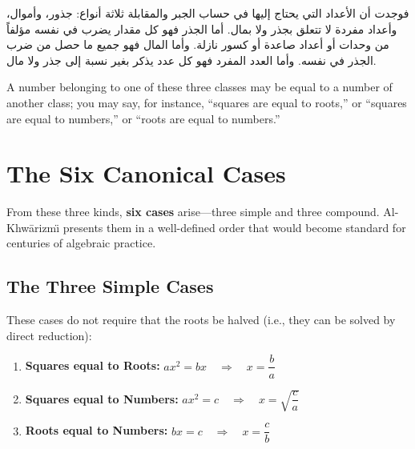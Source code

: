 \documentclass[11pt,a4paper,openany,oneside]{book}
\begin{document}
\begin{arabicbox}
\begin{Arabic}
فوجدت أن الأعداد التي يحتاج إليها في حساب الجبر والمقابلة
ثلاثة أنواع: جذور، وأموال، وأعداد مفردة لا تتعلق بجذر ولا
بمال. أما الجذر فهو كل مقدار يضرب في نفسه مؤلفاً من
وحدات أو أعداد صاعدة أو كسور نازلة. وأما المال فهو جميع ما
حصل من ضرب الجذر في نفسه. وأما العدد المفرد فهو كل عدد
يذكر بغير نسبة إلى جذر ولا مال.
\end{Arabic}
\end{arabicbox}

A number belonging to one of these three classes may be equal to a number of
another class; you may say, for instance, ``squares are equal to roots,'' or
``squares are equal to numbers,'' or ``roots are equal to numbers.''

\newpage

\section{The Six Canonical Cases}
\label{sec:six-cases}

From these three kinds, \textbf{six cases} arise---three simple and three
compound. Al-Khw\=arizm\"{\i} presents them in a well-defined order that would
become standard for centuries of algebraic practice.

\subsection{The Three Simple Cases}

These cases do not require that the roots be halved (i.e., they can be solved
by direct reduction):

\begin{mathbox}[title={\textbf{Simple Cases (do not require halving)}}]
\begin{enumerate}[label=\textbf{Case \Roman*:},leftmargin=3em]
  \item \textbf{Squares equal to Roots:}
  $ax^2 = bx \quad\Longrightarrow\quad x = \dfrac{b}{a}$
  
  \item \textbf{Squares equal to Numbers:}
  $ax^2 = c \quad\Longrightarrow\quad x = \sqrt{\dfrac{c}{a}}$
  
  \item \textbf{Roots equal to Numbers:}
  $bx = c \quad\Longrightarrow\quad x = \dfrac{c}{b}$
\end{enumerate}
\end{mathbox}
\end{document}
